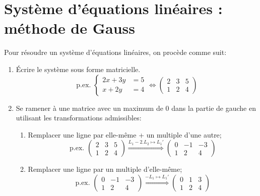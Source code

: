\section{Système d'équations linéaires : méthode de Gauss}


Pour résoudre un système d'équations linéaires, on procède comme suit:
\begin{enumerate}
\item Écrire le système sous forme matricielle. \[\text{p.ex. } \begin{cases} 2x+3y &= 5 \\ x+2y &= 4 \end{cases} \Leftrightarrow \left(\begin{array}{cc|c} 2 & 3 & 5 \\ 1 & 2 & 4 \end{array}\right) \]
\item Se ramener à une matrice avec un maximum de $0$ dans la partie de gauche en utilisant les transformations admissibles:
\begin{enumerate}
\item Remplacer une ligne par elle-même + un multiple d'une autre;
\[\text{p.ex. } \left(\begin{array}{cc|c} 2 & 3 & 5 \\ 1 & 2 & 4 \end{array}\right)  \stackrel{L_1  - 2. L_2 \mapsto L_1'}{\Longrightarrow} \left(\begin{array}{cc|c} 0 & -1 & -3 \\ 1 & 2 & 4 \end{array}\right) \]
\item Remplacer une ligne par un multiple d'elle-même;
\[\text{p.ex. } \left(\begin{array}{cc|c} 0 & -1 & -3 \\ 1 & 2 & 4 \end{array}\right)  \stackrel{-L_1  \mapsto L_1'}{\Longrightarrow} \left(\begin{array}{cc|c} 0 & 1 & 3 \\ 1 & 2 & 4 \end{array}\right) \]

\end{enumerate}
\end{enumerate}
